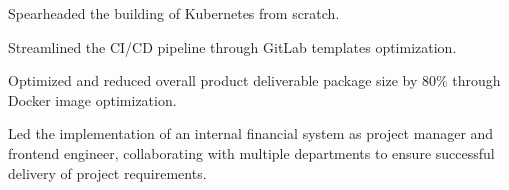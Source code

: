 \documentclass[]{deedy-resume-openfont}
\begin{document}
\begin{minipage}[t]{1\textwidth}
\null\hfill{}
\begin{tightemize}
    \item Spearheaded the building of Kubernetes from scratch.
    \item Streamlined the CI/CD pipeline through GitLab templates optimization.
    \item Optimized and reduced overall product deliverable package size by 80\% through Docker image optimization.
    \item Led the implementation of an internal financial system as project manager and frontend engineer, collaborating with multiple departments to ensure successful delivery of project requirements.
\end{tightemize}
\sectionsep


\end{minipage}
%
%
\end{document}
